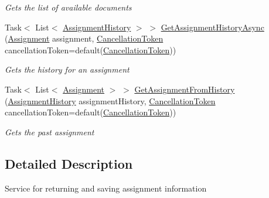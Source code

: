 \begin{DoxyCompactItemize}
\begin{DoxyCompactList}\small\item\em Gets the list of available documents \end{DoxyCompactList}\item 
Task$<$ List$<$ \hyperlink{class_field_service_1_1_data_1_1_assignment_history}{Assignment\+History} $>$ $>$ \hyperlink{interface_field_service_1_1_i_assignment_service_a1a89f56c0847daa1d8d9e3f0bd630e23}{Get\+Assignment\+History\+Async} (\hyperlink{class_field_service_1_1_data_1_1_assignment}{Assignment} assignment, \hyperlink{_view_models_2_assignment_view_model_8cs_aba80ec766846c61f55644fd23860cb18}{Cancellation\+Token} cancellation\+Token=default(\hyperlink{_view_models_2_assignment_view_model_8cs_aba80ec766846c61f55644fd23860cb18}{Cancellation\+Token}))
\begin{DoxyCompactList}\small\item\em Gets the history for an assignment \end{DoxyCompactList}\item 
Task$<$ List$<$ \hyperlink{class_field_service_1_1_data_1_1_assignment}{Assignment} $>$ $>$ \hyperlink{interface_field_service_1_1_i_assignment_service_ac0e1cf9d28486e8e9a7e4161fe048b9e}{Get\+Assignment\+From\+History} (\hyperlink{class_field_service_1_1_data_1_1_assignment_history}{Assignment\+History} assignment\+History, \hyperlink{_view_models_2_assignment_view_model_8cs_aba80ec766846c61f55644fd23860cb18}{Cancellation\+Token} cancellation\+Token=default(\hyperlink{_view_models_2_assignment_view_model_8cs_aba80ec766846c61f55644fd23860cb18}{Cancellation\+Token}))
\begin{DoxyCompactList}\small\item\em Gets the past assignment \end{DoxyCompactList}\end{DoxyCompactItemize}


\subsection{Detailed Description}
Service for returning and saving assignment information 



